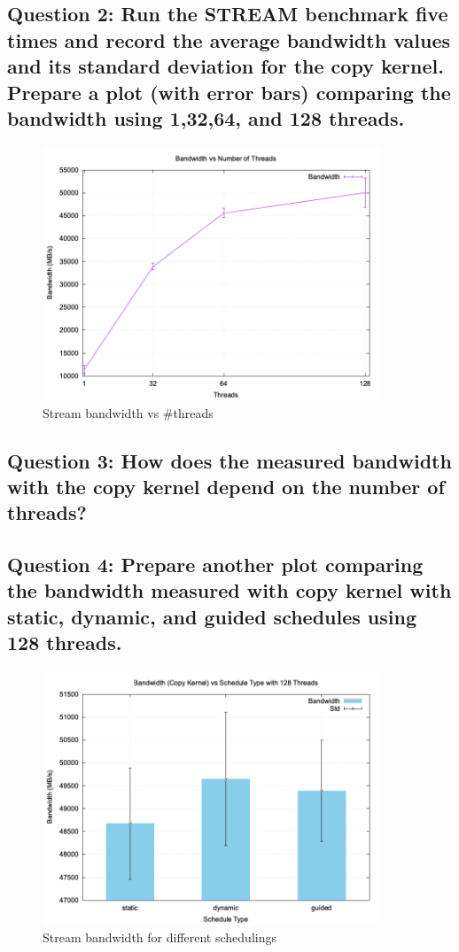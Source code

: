 \documentclass[a4paper,10pt]{article}
\begin{document}
\subsection{Question 2: Run the STREAM benchmark five times and record the average bandwidth values and its standard deviation for the copy kernel. Prepare a plot (with error bars) comparing the bandwidth using 1,32,64, and 128 threads.}
\begin{figure}[H]
  \centering
  \includegraphics[width=0.9\textwidth]{img/ex2/ex2_threads.png}
  \caption{Stream bandwidth vs \#threads}
  \label{fig:ex2-threads}
\end{figure}

\subsection{Question 3: How does the measured bandwidth with the copy kernel depend on the number of threads?}
\subsection{Question 4: Prepare another plot comparing the bandwidth measured with copy kernel with static, dynamic, and guided schedules using 128 threads.}
\begin{figure}[H]
  \centering
  \includegraphics[width=0.9\textwidth]{img/ex2/ex2_schedule.png}
  \caption{Stream bandwidth for different schedulings}
  \label{fig:ex2-schedule}
\end{figure}
\end{document}
